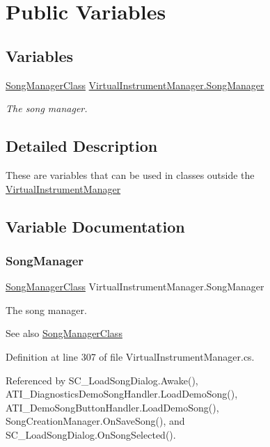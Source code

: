 \hypertarget{group___v_i_m_pub}{}\section{Public Variables}
\label{group___v_i_m_pub}
\subsection*{Variables}
\begin{DoxyCompactItemize}
\item 
\hyperlink{class_song_manager_class}{Song\+Manager\+Class} \hyperlink{group___v_i_m_pub_ga33dae94932c10c66db76a0eebec76b01}{Virtual\+Instrument\+Manager.\+Song\+Manager}
\begin{DoxyCompactList}\small\item\em The song manager. \end{DoxyCompactList}\end{DoxyCompactItemize}


\subsection{Detailed Description}
These are variables that can be used in classes outside the \hyperlink{class_virtual_instrument_manager}{Virtual\+Instrument\+Manager} 

\subsection{Variable Documentation}
\mbox{\label{group___v_i_m_pub_ga33dae94932c10c66db76a0eebec76b01}} 
\subsubsection{\texorpdfstring{Song\+Manager}{SongManager}}
{\footnotesize\ttfamily \hyperlink{class_song_manager_class}{Song\+Manager\+Class} Virtual\+Instrument\+Manager.\+Song\+Manager}



The song manager. 

\begin{DoxySeeAlso}{See also}
\hyperlink{class_song_manager_class}{Song\+Manager\+Class} 
\end{DoxySeeAlso}


Definition at line 307 of file Virtual\+Instrument\+Manager.\+cs.



Referenced by S\+C\+\_\+\+Load\+Song\+Dialog.\+Awake(), A\+T\+I\+\_\+\+Diagnostics\+Demo\+Song\+Handler.\+Load\+Demo\+Song(), A\+T\+I\+\_\+\+Demo\+Song\+Button\+Handler.\+Load\+Demo\+Song(), Song\+Creation\+Manager.\+On\+Save\+Song(), and S\+C\+\_\+\+Load\+Song\+Dialog.\+On\+Song\+Selected().

